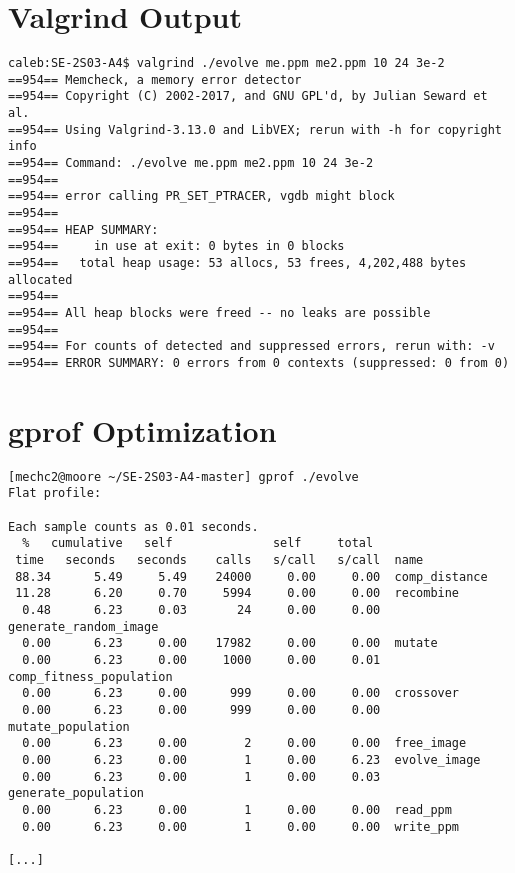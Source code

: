 \documentclass{article}
\begin{document}
\section*{Valgrind Output}
\begin{verbatim}
caleb:SE-2S03-A4$ valgrind ./evolve me.ppm me2.ppm 10 24 3e-2
==954== Memcheck, a memory error detector
==954== Copyright (C) 2002-2017, and GNU GPL'd, by Julian Seward et al.
==954== Using Valgrind-3.13.0 and LibVEX; rerun with -h for copyright info
==954== Command: ./evolve me.ppm me2.ppm 10 24 3e-2
==954==
==954== error calling PR_SET_PTRACER, vgdb might block
==954==
==954== HEAP SUMMARY:
==954==     in use at exit: 0 bytes in 0 blocks
==954==   total heap usage: 53 allocs, 53 frees, 4,202,488 bytes allocated
==954==
==954== All heap blocks were freed -- no leaks are possible
==954==
==954== For counts of detected and suppressed errors, rerun with: -v
==954== ERROR SUMMARY: 0 errors from 0 contexts (suppressed: 0 from 0)
\end{verbatim}

\section*{gprof Optimization}
\begin{verbatim}
[mechc2@moore ~/SE-2S03-A4-master] gprof ./evolve
Flat profile:

Each sample counts as 0.01 seconds.
  %   cumulative   self              self     total
 time   seconds   seconds    calls   s/call   s/call  name
 88.34      5.49     5.49    24000     0.00     0.00  comp_distance
 11.28      6.20     0.70     5994     0.00     0.00  recombine
  0.48      6.23     0.03       24     0.00     0.00  generate_random_image
  0.00      6.23     0.00    17982     0.00     0.00  mutate
  0.00      6.23     0.00     1000     0.00     0.01  comp_fitness_population
  0.00      6.23     0.00      999     0.00     0.00  crossover
  0.00      6.23     0.00      999     0.00     0.00  mutate_population
  0.00      6.23     0.00        2     0.00     0.00  free_image
  0.00      6.23     0.00        1     0.00     6.23  evolve_image
  0.00      6.23     0.00        1     0.00     0.03  generate_population
  0.00      6.23     0.00        1     0.00     0.00  read_ppm
  0.00      6.23     0.00        1     0.00     0.00  write_ppm

[...]
\end{verbatim}
\end{document}

